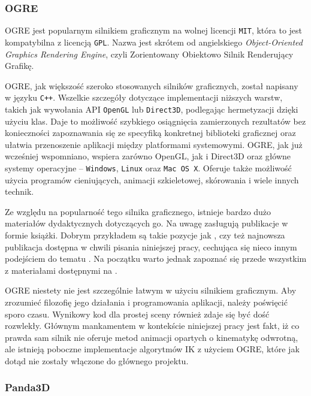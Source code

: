 \documentclass[11pt]{mwrep}
\begin{document}
 
      \subsubsection{OGRE}

      OGRE jest popularnym silnikiem graficznym na wolnej licencji \texttt{MIT}, która to jest kompatybilna z licencją \texttt{GPL}. Nazwa jest skrótem od angielskiego \textit{Object-Oriented Graphics Rendering Engine}, czyli Zorientowany Obiektowo Silnik Renderujący Grafikę.

      OGRE, jak większość szeroko stosowanych silników graficznych, został napisany w języku \texttt{C++}. Wszelkie szczegóły dotyczące implementacji niższych warstw, takich jak wywołania API \texttt{OpenGL} lub \texttt{Direct3D}, podlegając hermetyzacji dzięki użyciu klas. Daje to możliwość szybkiego osiągnięcia zamierzonych rezultatów bez konieczności zapoznawania się ze specyfiką konkretnej biblioteki graficznej oraz ułatwia przenoszenie aplikacji między platformami systemowymi. OGRE, jak już wcześniej wspomniano, wspiera zarówno OpenGL, jak i Direct3D oraz główne systemy operacyjne -- \texttt{Windows}, \texttt{Linux} oraz \texttt{Mac OS X}. Oferuje także możliwość użycia programów cieniujących, animacji szkieletowej, skórowania i wiele innych technik. 

      Ze względu na popularność tego silnika graficznego, istnieje bardzo dużo materiałów dydaktycznych dotyczących go. Na uwagę zasługują publikacje w formie książki. Dobrym przykładem są takie pozycje jak \cite{ogreb1}, czy też najnowsza publikacja dostępna w chwili pisania niniejszej pracy, cechująca się nieco innym podejściem do tematu \cite{ogreb2}. Na początku warto jednak zapoznać się przede wszystkim z materiałami dostępnymi na \cite{ogre}.

      OGRE niestety nie jest szczególnie łatwym w użyciu silnikiem graficznym. Aby zrozumieć filozofię jego działania i programowania aplikacji, należy poświęcić sporo czasu. Wynikowy kod dla prostej sceny również zdaje się być dość rozwlekły. Głównym mankamentem w kontekście niniejszej pracy jest fakt, iż co prawda sam silnik nie oferuje metod animacji opartych o kinematykę odwrotną, ale istnieją poboczne implementacje algorytmów IK z użyciem OGRE, które jak dotąd nie zostały włączone do głównego projektu.

      \subsubsection{Panda3D}
\end{document}
